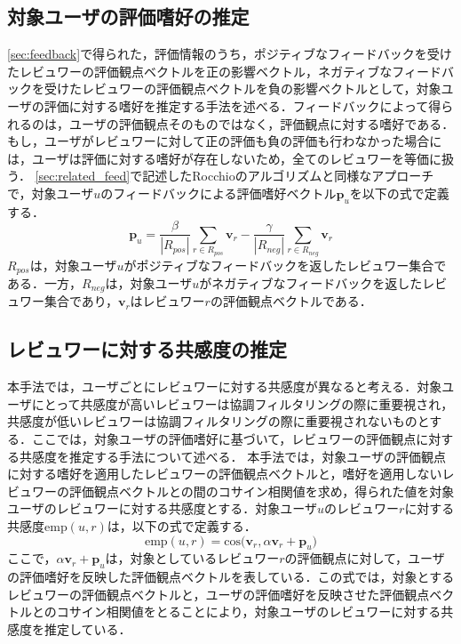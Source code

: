 \documentclass[a4paper,11pt,oneside,openany]{jsbook}
\begin{document}
		\subsection{対象ユーザの評価嗜好の推定}
\ref{sec:feedback}で得られた，評価情報のうち，ポジティブなフィードバックを受けたレビュワーの評価観点ベクトルを正の影響ベクトル，ネガティブなフィードバックを受けたレビュワーの評価観点ベクトルを負の影響ベクトルとして，対象ユーザの評価に対する嗜好を推定する手法を述べる．フィードバックによって得られるのは，ユーザの評価観点そのものではなく，評価観点に対する嗜好である．もし，ユーザがレビュワーに対して正の評価も負の評価も行わなかった場合には，ユーザは評価に対する嗜好が存在しないため，全てのレビュワーを等価に扱う．
\ref{sec:related_feed}で記述したRocchioのアルゴリズムと同様なアプローチで，対象ユーザ$u$のフィードバックによる評価嗜好ベクトル$\mathbf{p}_{u}$を以下の式で定義する．
\begin{equation}
\mathbf{p}_{u} = \frac{\beta}{|R_{pos}|}\sum_{{r}\in{R_{pos}}}{\mathbf{v}_{r}}-\frac{\gamma}{|R_{neg}|}\sum_{{r}\in{R_{neg}}}{\mathbf{v}_{r}} 
\end{equation}
$R_{pos}$は，対象ユーザ$u$がポジティブなフィードバックを返したレビュワー集合である．一方，$R_{neg}$は，対象ユーザ$u$がネガティブなフィードバックを返したレビュワー集合であり，$\mathbf{v}_{r}$はレビュワー$r$の評価観点ベクトルである．

		\subsection{レビュワーに対する共感度の推定}
\label{subsec:weight}
本手法では，ユーザごとにレビュワーに対する共感度が異なると考える．対象ユーザにとって共感度が高いレビュワーは協調フィルタリングの際に重要視され，共感度が低いレビュワーは協調フィルタリングの際に重要視されないものとする．ここでは，対象ユーザの評価嗜好に基づいて，レビュワーの評価観点に対する共感度を推定する手法について述べる．
本手法では，対象ユーザの評価観点に対する嗜好を適用したレビュワーの評価観点ベクトルと，嗜好を適用しないレビュワーの評価観点ベクトルとの間のコサイン相関値を求め，得られた値を対象ユーザのレビュワーに対する共感度とする．対象ユーザ$u$のレビュワー$r$に対する共感度$\mathrm{emp}(u,r)$は，以下の式で定義する．
\begin{equation}
\mathrm{emp}(u,r) = \mathrm{cos}\bigl( \mathbf{v}_{r} , \alpha\mathbf{v}_{r}+\mathbf{p}_{u}\bigr)
\end{equation}
ここで，$\alpha\mathbf{v}_{r}+\mathbf{p}_{u}$は，対象としているレビュワー$r$の評価観点に対して，ユーザの評価嗜好を反映した評価観点ベクトルを表している．この式では，対象とするレビュワーの評価観点ベクトルと，ユーザの評価嗜好を反映させた評価観点ベクトルとのコサイン相関値をとることにより，対象ユーザのレビュワーに対する共感度を推定している．
\end{document}
